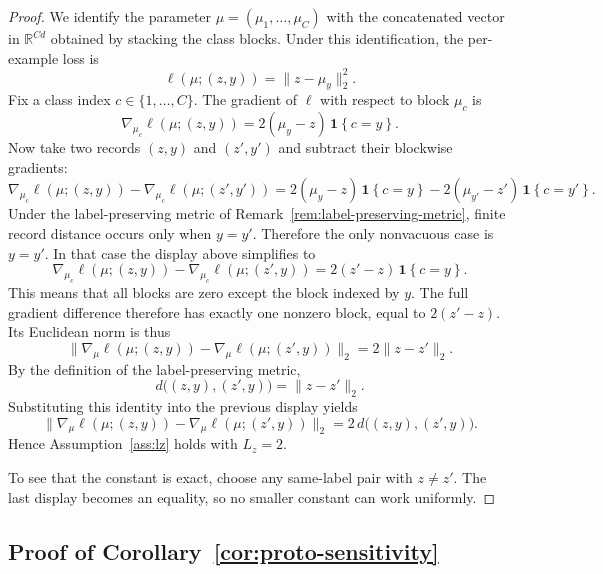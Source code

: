 \documentclass[conference,compsoc]{IEEEtran}
\newcommand{\ind}[1]{\mathbf{1}\!\left\{#1\right\}}
\begin{document}
\begin{proof}
We identify the parameter $\mu=(\mu_1,\dots,\mu_C)$ with the concatenated vector in $\mathbb{R}^{Cd}$ obtained by stacking the class blocks. Under this identification, the per-example loss is
\[
\ell(\mu;(z,y))=\|z-\mu_y\|_2^2.
\]
Fix a class index $c\in\{1,\dots,C\}$. The gradient of $\ell$ with respect to block $\mu_c$ is
\[
\nabla_{\mu_c}\ell(\mu;(z,y))
=
2(\mu_y-z)\,\ind{c=y}.
\]
Now take two records $(z,y)$ and $(z',y')$ and subtract their blockwise gradients:
\[
\nabla_{\mu_c}\ell(\mu;(z,y))-
\nabla_{\mu_c}\ell(\mu;(z',y'))
=
2(\mu_y-z)\,\ind{c=y}-2(\mu_{y'}-z')\,\ind{c=y'}.
\]
Under the label-preserving metric of Remark~\ref{rem:label-preserving-metric}, finite record distance occurs only when $y=y'$. Therefore the only nonvacuous case is $y=y'$. In that case the display above simplifies to
\[
\nabla_{\mu_c}\ell(\mu;(z,y))-
\nabla_{\mu_c}\ell(\mu;(z',y))
=
2(z'-z)\,\ind{c=y}.
\]
This means that all blocks are zero except the block indexed by $y$. The full gradient difference therefore has exactly one nonzero block, equal to $2(z'-z)$. Its Euclidean norm is thus
\[
\|\nabla_\mu \ell(\mu;(z,y))-
\nabla_\mu \ell(\mu;(z',y))\|_2
=
2\|z-z'\|_2.
\]
By the definition of the label-preserving metric,
\[
d\big((z,y),(z',y)\big)=\|z-z'\|_2.
\]
Substituting this identity into the previous display yields
\[
\|\nabla_\mu \ell(\mu;(z,y))-
\nabla_\mu \ell(\mu;(z',y))\|_2
=
2\,d\big((z,y),(z',y)\big).
\]
Hence Assumption~\ref{ass:lz} holds with $L_z=2$.

To see that the constant is exact, choose any same-label pair with $z\neq z'$. The last display becomes an equality, so no smaller constant can work uniformly.
\end{proof}

\subsection{Proof of Corollary~\ref{cor:proto-sensitivity}}
\end{document}
